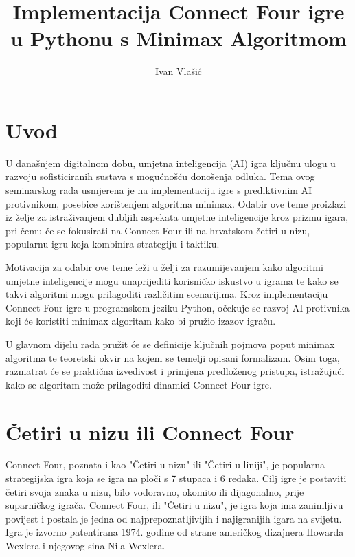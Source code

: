 \documentclass[]{foi}
\title{Implementacija Connect Four igre u Pythonu s Minimax Algoritmom}
\author{Ivan Vlašić}
\begin{document}
\maketitle

\tableofcontents

\makeatletter {} \makeatother
\pagestyle{plain}



\chapter{Uvod}

U današnjem digitalnom dobu, umjetna inteligencija (AI) igra ključnu ulogu u razvoju sofisticiranih sustava s mogućnošću donošenja odluka. Tema ovog seminarskog rada usmjerena je na implementaciju igre s prediktivnim AI protivnikom, posebice korištenjem algoritma minimax. Odabir ove teme proizlazi iz želje za istraživanjem dubljih aspekata umjetne inteligencije kroz prizmu igara, pri čemu će se fokusirati na Connect Four ili na hrvatskom četiri u nizu, popularnu igru koja kombinira strategiju i taktiku.

Motivacija za odabir ove teme leži u želji za razumijevanjem kako algoritmi umjetne inteligencije mogu unaprijediti korisničko iskustvo u igrama te kako se takvi algoritmi mogu prilagoditi različitim scenarijima. Kroz implementaciju Connect Four igre u programskom jeziku Python, očekuje se razvoj AI protivnika koji će koristiti minimax algoritam kako bi pružio izazov igraču.

U glavnom dijelu rada pružit će se definicije ključnih pojmova poput minimax algoritma te teoretski okvir na kojem se temelji opisani formalizam. Osim toga, razmatrat će se praktična izvedivost i primjena predloženog pristupa, istražujući kako se algoritam može prilagoditi dinamici Connect Four igre. 



\chapter{Četiri u nizu ili Connect Four}

Connect Four, poznata i kao "Četiri u nizu" ili "Četiri u liniji", je popularna strategijska igra koja se igra na ploči s 7 stupaca i 6 redaka. Cilj igre je postaviti četiri svoja znaka u nizu, bilo vodoravno, okomito ili dijagonalno, prije suparničkog igrača. Connect Four, ili "Četiri u nizu", je igra koja ima zanimljivu povijest i postala je jedna od najprepoznatljivijih i najigranijih igara na svijetu.  Igra je izvorno patentirana 1974. godine od strane američkog dizajnera Howarda Wexlera i njegovog sina Nila Wexlera. 
\end{document}
